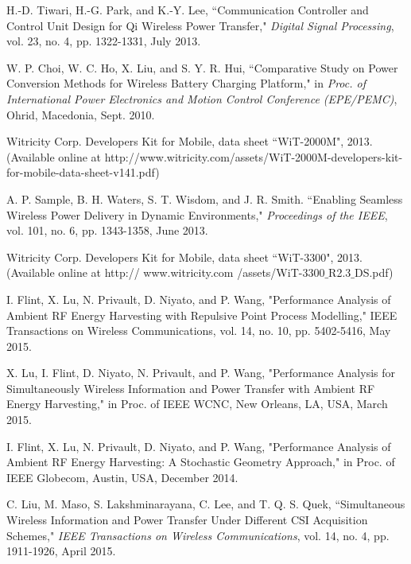 \documentclass[twocolumn,10pt]{IEEEtran}
\begin{document}
\begin{thebibliography}{99}
H.-D. Tiwari, H.-G. Park, and K.-Y. Lee, ``Communication Controller and Control Unit Design for Qi Wireless Power Transfer," \emph{Digital Signal Processing}, vol. 23, no. 4, pp. 1322-1331, July 2013. 



W. P. Choi, W. C. Ho, X. Liu, and S. Y. R. Hui, ``Comparative Study on Power Conversion Methods for Wireless Battery Charging Platform," in \emph{Proc. of International Power Electronics and Motion Control Conference (EPE/PEMC)}, Ohrid, Macedonia, Sept. 2010. 
 

Witricity Corp. Developers Kit for Mobile, data sheet ``WiT-2000M", 2013. (Available online at http://www.witricity.com/assets/WiT-2000M-developers-kit-for-mobile-data-sheet-v141.pdf)



A. P. Sample, B. H. Waters, S. T. Wisdom, and J. R. Smith.
``Enabling Seamless Wireless Power Delivery in Dynamic
Environments," \emph{Proceedings of the IEEE},  vol. 101, no. 6, pp. 1343-1358, June 2013.

Witricity Corp. Developers Kit for Mobile, data sheet ``WiT-3300", 2013.
(Available online at http:// www.witricity.com /assets/WiT-3300$\_$R2.3$\_$DS.pdf) 




I. Flint, X. Lu, N. Privault, D. Niyato, and P. Wang, "Performance Analysis of Ambient RF Energy Harvesting with Repulsive Point Process Modelling," IEEE Transactions on Wireless Communications, vol. 14, no. 10, pp. 5402-5416, May 2015. 

X. Lu, I. Flint, D. Niyato, N. Privault, and P. Wang, "Performance Analysis for Simultaneously Wireless Information and Power Transfer with Ambient RF Energy Harvesting," in Proc. of IEEE WCNC, New Orleans, LA, USA, March 2015.

I. Flint, X. Lu, N. Privault, D. Niyato, and P. Wang, "Performance Analysis of Ambient RF Energy Harvesting: A Stochastic Geometry Approach," in Proc. of IEEE Globecom, Austin, USA, December 2014.

C. Liu, M.  Maso,  S. Lakshminarayana, C. Lee, and T. Q. S. Quek,  
``Simultaneous Wireless Information and Power Transfer Under Different CSI Acquisition Schemes," \emph{IEEE Transactions on 
Wireless Communications}, vol. 14, no. 4, pp. 1911-1926, April 2015. 


\end{thebibliography}
\end{document}
